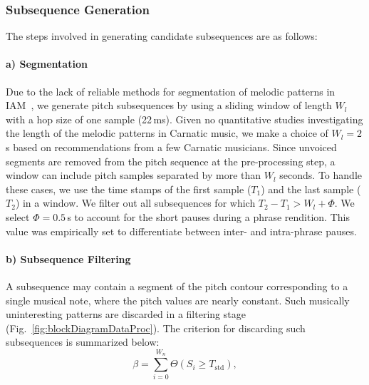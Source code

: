 \subsubsection{Subsequence Generation}
\label{sec:subsequencegeneration}
The steps involved in generating candidate subsequences are as follows:
\paragraph{a) Segmentation} Due to the lack of reliable methods for segmentation of melodic patterns in IAM~\cite{gulati2014Landmark}, we generate pitch subsequences by using a sliding window of length $W_l$ with a hop size of one sample (22\,ms). Given no quantitative studies investigating the length of the melodic patterns in Carnatic music, we make a choice of $W_l = 2$\,s based on recommendations from a few Carnatic musicians. Since unvoiced segments are removed from the pitch sequence at the pre-processing step, a window can include pitch samples separated by more than $W_l$ seconds. To handle these cases, we use the time stamps of the first sample ($T_1$) and the last sample ($T_2$) in a window. We filter out all subsequences for which $T_2-T_1 > W_l + \Phi$. We select $\Phi =0.5$\,s to account for the short pauses during a phrase rendition. This value was empirically set to differentiate between inter- and intra-phrase pauses.%


\paragraph{b) Subsequence Filtering} A subsequence may contain a segment of the pitch contour corresponding to a single musical note, where the pitch values are nearly constant. Such musically uninteresting patterns are discarded in a filtering stage (Fig.~\ref{fig:blockDiagramDataProc}). The criterion for discarding such subsequences is summarized below:
\begin{equation*}
\beta =\sum_{i=0}^{W_n} \Theta\left(S_i\geq T_{\text{std}}\right),
\end{equation*}


